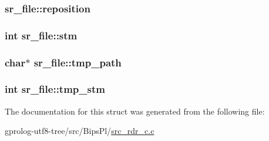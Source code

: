 \subsubsection[{\texorpdfstring{reposition}{reposition}}]{ sr\+\_\+file\+::reposition}\hypertarget{structsr__file_a090b36b9b75dfbccd963f6787fd3f18e}{}\label{structsr__file_a090b36b9b75dfbccd963f6787fd3f18e}
\subsubsection[{\texorpdfstring{stm}{stm}}]{\setlength{\rightskip}{0pt plus 5cm}int sr\+\_\+file\+::stm}\hypertarget{structsr__file_a586a54828b5daba157cc712806a6f2b3}{}\label{structsr__file_a586a54828b5daba157cc712806a6f2b3}
\subsubsection[{\texorpdfstring{tmp\+\_\+path}{tmp_path}}]{\setlength{\rightskip}{0pt plus 5cm}char$\ast$ sr\+\_\+file\+::tmp\+\_\+path}\hypertarget{structsr__file_adc9ad8d65ba5f5b3bfc7a6c6ca329d88}{}\label{structsr__file_adc9ad8d65ba5f5b3bfc7a6c6ca329d88}
\subsubsection[{\texorpdfstring{tmp\+\_\+stm}{tmp_stm}}]{\setlength{\rightskip}{0pt plus 5cm}int sr\+\_\+file\+::tmp\+\_\+stm}\hypertarget{structsr__file_a200078e5cefb8ff2bd556997ff08b429}{}\label{structsr__file_a200078e5cefb8ff2bd556997ff08b429}


The documentation for this struct was generated from the following file\+:\begin{DoxyCompactItemize}
\item 
gprolog-\/utf8-\/tree/src/\+Bips\+Pl/\hyperlink{src__rdr__c_8c}{src\+\_\+rdr\+\_\+c.\+c}\end{DoxyCompactItemize}
